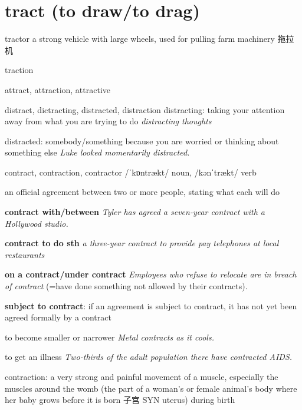 \chapter{tract (to draw/to drag)}

\begin{word}{tractor}
    a strong vehicle with large wheels, used for pulling farm machinery 拖拉机
\end{word}

\begin{word}{traction}
\end{word}

\begin{word}{attract, attraction, attractive}
\end{word}

\begin{word}{distract, dictracting, distracted, distraction}
    distracting: taking your attention away from what you are trying to do
    \textit{distracting thoughts}

    distracted: somebody/something because you are worried or thinking about something else
    \textit{Luke looked momentarily distracted.}
\end{word}

\begin{word}{contract, contraction, contractor}
    /ˈkɒntrækt/ noun, /kənˈtrækt/ verb

    an official agreement between two or more people, stating what each will do

    \textbf{contract with/between}
    \textit{Tyler has agreed a seven-year contract with a Hollywood studio.}

    \textbf{contract to do sth}
    \textit{a three-year contract to provide pay telephones at local restaurants}

    \textbf{on a contract/under contract}
    \textit{Employees who refuse to relocate are in breach of contract} (=have done something not allowed by their contracts).


    \textbf{subject to contract}: if an agreement is subject to contract, it has not yet been agreed formally by a contract

    to become smaller or narrower
    \textit{Metal contracts as it cools.}

    to get an illness
    \textit{Two-thirds of the adult population there have contracted AIDS.}

    contraction: a very strong and painful movement of a muscle, especially the muscles around the womb (the part of a woman’s or female animal’s body where her baby grows before it is born 子宫 SYN  uterus) during birth
\end{word}

